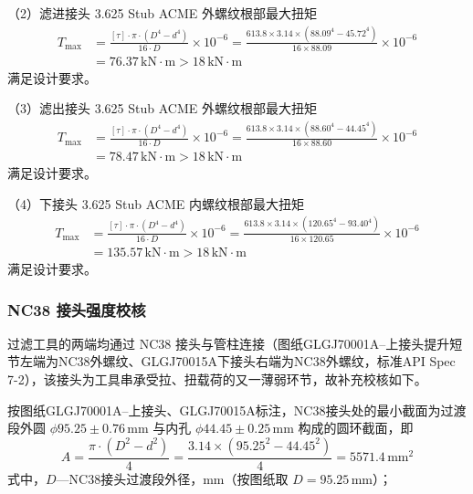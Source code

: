 （2）滤进接头 3.625 Stub ACME 外螺纹根部最大扭矩
\begin{equation}
    \begin{aligned}
        T_{\max} &= \frac{[\tau] \cdot \pi \cdot (D^4 - d^4)}{16 \cdot D} \times 10^{-6} 
                = \frac{613.8 \times 3.14 \times (88.09^4 - 45.72^4)}{16 \times 88.09} \times 10^{-6} \\
                &= 76.37\,\text{kN} \cdot \text{m} > 18\,\text{kN} \cdot \text{m}
    \end{aligned}
\end{equation}
满足设计要求。

（3）滤出接头 3.625 Stub ACME 外螺纹根部最大扭矩
\begin{equation}
    \begin{aligned}
        T_{\max} &= \frac{[\tau] \cdot \pi \cdot (D^4 - d^4)}{16 \cdot D} \times 10^{-6} 
                 = \frac{613.8 \times 3.14 \times (88.60^4 - 44.45^4)}{16 \times 88.60} \times 10^{-6} \\
                 &= 78.47\,\text{kN} \cdot \text{m} > 18\,\text{kN} \cdot \text{m}
    \end{aligned}
\end{equation}
满足设计要求。

（4）下接头 3.625 Stub ACME 内螺纹根部最大扭矩
\begin{equation}
    \begin{aligned}
        T_{\max} &= \frac{[\tau] \cdot \pi \cdot (D^4 - d^4)}{16 \cdot D} \times 10^{-6} 
             = \frac{613.8 \times 3.14 \times (120.65^4 - 93.40^4)}{16 \times 120.65} \times 10^{-6} \\
             &= 135.57\,\text{kN} \cdot \text{m} > 18\,\text{kN} \cdot \text{m}
    \end{aligned}
\end{equation}
满足设计要求。


\subsubsection{NC38 接头强度校核}

过滤工具的两端均通过 NC38 接头与管柱连接（图纸GLGJ70001A--上接头提升短节左端为NC38外螺纹、GLGJ70015A下接头右端为NC38外螺纹，标准API Spec 7-2），该接头为工具串承受拉、扭载荷的又一薄弱环节，故补充校核如下。

按图纸GLGJ70001A--上接头、GLGJ70015A标注，NC38接头处的最小截面为过渡段外圆 $\phi 95.25\pm0.76\,\text{mm}$ 与内孔 $\phi 44.45\pm0.25\,\text{mm}$ 构成的圆环截面，即
\begin{equation}
    A = \frac{\pi \cdot (D^2 - d^2)}{4} = \frac{3.14 \times (95.25^2 - 44.45^2)}{4} = 5571.4\,\text{mm}^2
\end{equation}
式中，$D$---NC38接头过渡段外径，mm（按图纸取 $D = 95.25$\,mm）；

